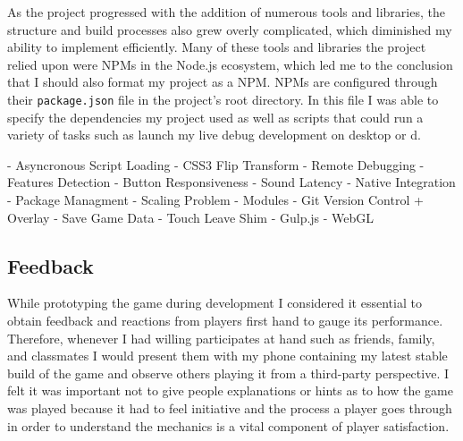 \documentclass[final]{cmpreport}
\begin{document}
As the project progressed with the addition of numerous tools and libraries, the structure and build processes also grew overly complicated, which diminished my ability to implement efficiently. Many of these tools and libraries the project relied upon were NPMs in the Node.js ecosystem, which led me to the conclusion that I should also format my project as a NPM. NPMs are configured through their \texttt{package.json} file in the project's root directory. In this file I was able to specify the dependencies my project used as well as scripts that could run a variety of tasks such as launch my live debug development on desktop or d. 


- Asyncronous Script Loading
- CSS3 Flip Transform
- Remote Debugging
- Features Detection
- Button Responsiveness
- Sound Latency
- Native Integration
- Package Managment
- Scaling Problem
- Modules
- Git Version Control + Overlay
- Save Game Data
- Touch Leave Shim
- Gulp.js
- WebGL





\subsection{Feedback}
While prototyping the game during development I considered it essential to obtain feedback and reactions from players first hand to gauge its performance. Therefore, whenever I had willing participates at hand such as friends, family, and classmates I would present them with my phone containing my latest stable build of the game and observe others playing it from a third-party perspective. I felt it was important not to give people explanations or hints as to how the game was played because it had to feel initiative and the process a player goes through in order to understand the mechanics is a vital component of player satisfaction.
\end{document}
